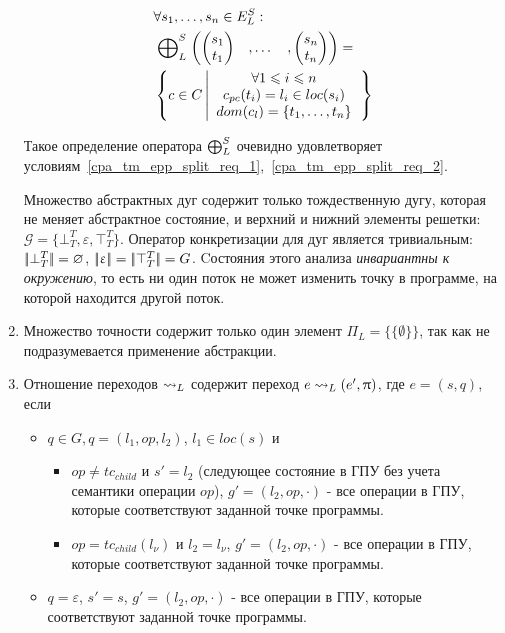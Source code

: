 \begin{enumerate}
\begin{equation}
\label{location_epp_def}
\begin{aligned}
&\forall s_1, \dots, s_n \in E^S_L:\\
&\mathrel{\bigoplus}^S_{L}
\begin{pmatrix}
\begin{pmatrix}
s_1 \\
t_1 
\end{pmatrix}& ,
\dots& ,
\begin{pmatrix}
s_n \\
t_n 
\end{pmatrix}
\end{pmatrix} = \\
& \left\lbrace c \in C 
\left| 
\begin{array}{c}
\forall 1 \leqslant i \leqslant n \\
c_{pc}(t_i) = l_i \in loc(s_i) \\
dom(c_l) = \{t_1, \dots, t_n\}\\
\end{array}
\right.
\right\rbrace\\
\end{aligned}
\end{equation}

Такое определение оператора $\mathrel{\bigoplus}^S_{L}$ очевидно удовлетворяет условиям~\ref{cpa_tm_epp_split_req_1},~\ref{cpa_tm_epp_split_req_2}.

Множество абстрактных дуг содержит только тождественную дугу, которая не меняет абстрактное состояние, и верхний и нижний элементы решетки: $\mathcal{G} = \{\bot^T_T, \varepsilon, \top^T_T\}$.
Оператор конкретизации для дуг является тривиальным: $\lvert \! \lvert \bot^T_T \rvert \! \rvert = \varnothing$, $\lvert \! \lvert \upvarepsilon \rvert \! \rvert = \lvert \! \lvert \top^T_T \rvert \! \rvert = G$.
Cостояния этого анализа {\em инвариантны к окружению}, то есть ни один поток не может изменить точку в программе, на которой находится другой поток.

\item Множество точности содержит только один элемент $\Pi_L = \{\{\emptyset\}\}$, так как не подразумевается применение абстракции.

\item Отношение переходов $\leadsto_L$ содержит переход $e \leadsto_L (e', \uppi)$, где $e = (s, q)$, если 
\begin{itemize}
\item $q \in G, q=(l_1,op,l_2)$, $l_1 \in loc(s)$ и
\begin{itemize}
\item $op \neq tc_{child}$ и $s' = l_2$ (следующее состояние в ГПУ без учета семантики операции $op$), $g' = (l_2, op, \cdot)$ - все операции в ГПУ, которые соответствуют заданной точке программы.
\item $op=tc_{child}(l_\nu)$ и $l_2 = l_\nu$, $g' = (l_2, op, \cdot)$ - все операции в ГПУ, которые соответствуют заданной точке программы.
\end{itemize}
\item $q = \varepsilon$, $s'=s$, $g' = (l_2, op, \cdot)$ - все операции в ГПУ, которые соответствуют заданной точке программы.
\end{itemize}


\end{enumerate}
